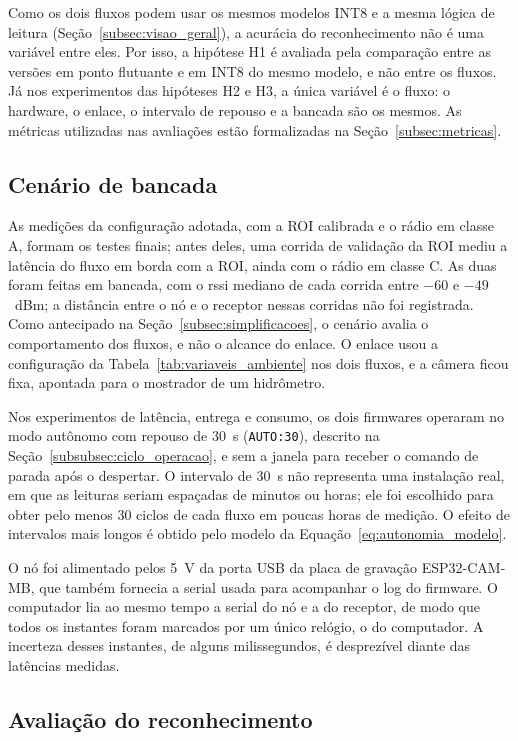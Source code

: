 Como os dois fluxos podem usar os mesmos modelos INT8 e a mesma lógica de leitura
(Seção~\ref{subsec:visao_geral}), a acurácia do reconhecimento não é uma variável entre
eles. Por isso, a hipótese H1 é avaliada pela comparação entre as versões em ponto
flutuante e em INT8 do mesmo modelo, e não entre os fluxos. Já nos experimentos das
hipóteses H2 e H3, a única variável é o fluxo: o hardware, o enlace, o intervalo de repouso
e a bancada são os mesmos. As métricas utilizadas nas avaliações estão formalizadas na
Seção~\ref{subsec:metricas}.

\subsection{Cenário de bancada}
\label{subsec:bancada}

As medições da configuração adotada, com a ROI calibrada e o rádio em classe A, formam
os testes finais; antes deles, uma corrida de validação da ROI mediu a latência do fluxo em
borda com a ROI, ainda com o rádio em classe C. As duas foram feitas em
bancada, com o \gls{rssi} mediano de cada corrida entre $-60$ e $-49$~dBm; a distância
entre o nó e o receptor nessas corridas não foi registrada. Como antecipado na
Seção~\ref{subsec:simplificacoes}, o cenário avalia o comportamento dos fluxos, e não o
alcance do enlace. O enlace usou a configuração da Tabela~\ref{tab:variaveis_ambiente} nos
dois fluxos, e a câmera ficou fixa, apontada para o mostrador de um hidrômetro.

Nos experimentos de latência, entrega e consumo, os dois firmwares operaram no modo
autônomo com repouso de 30~s (\texttt{AUTO:30}), descrito na
Seção~\ref{subsubsec:ciclo_operacao}, e sem a janela para receber o comando de parada após
o despertar. O intervalo de 30~s não representa uma instalação real, em que as leituras
seriam espaçadas de minutos ou horas; ele foi escolhido para obter pelo menos 30 ciclos de
cada fluxo em poucas horas de medição. O efeito de intervalos mais longos é obtido pelo
modelo da Equação~\eqref{eq:autonomia_modelo}.

O nó foi alimentado pelos 5~V da porta USB da placa de gravação ESP32-CAM-MB, que também
fornecia a serial usada para acompanhar o log do firmware. O computador lia ao mesmo tempo
a serial do nó e a do receptor, de modo que todos os instantes foram marcados por um único
relógio, o do computador. A incerteza desses instantes, de alguns milissegundos, é
desprezível diante das latências medidas.

\subsection{Avaliação do reconhecimento}
\label{subsec:exp_ocr}

